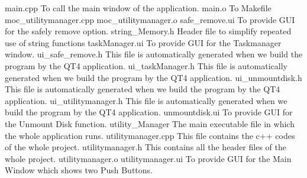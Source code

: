 main.cpp	       	 To call the main window of the application.
main.o	        	 To 
Makefile
moc_utilitymanager.cpp
moc_utilitymanager.o
safe_remove.ui  	 To provide GUI for the safely remove option.
string_Memory.h 	 Header file to simplify repeated use of string functions
taskManager.ui  	 To provide GUI for the Taskmanager window.
ui_safe_remove.h 	 This file is automatically generated when we build the program by the QT4 application.
ui_taskManager.h	 This file is automatically generated when we build the program by the QT4 application.
ui_unmountdisk.h	 This file is automatically generated when we build the program by the QT4 application.
ui_utilitymanager.h	 This file is automatically generated when we build the program by the QT4 application.
unmountdisk.ui		 To provide GUI for the Unmount Disk function.
utility_Manager		 The main executable file in which the whole application runs.
utilitymanager.cpp	 This file contains the c++ codes of the whole project.
utilitymanager.h	 This contains all the header files of the whole project.	
utilitymanager.o
utilitymanager.ui	 To provide GUI for the Main Window which shows two Push Buttons.
